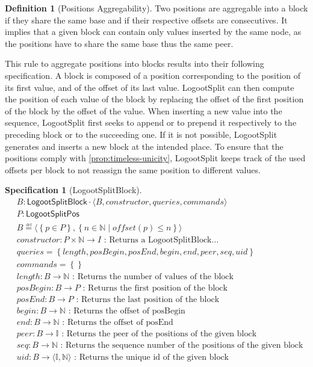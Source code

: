 \documentclass{article}
\newcommand{\commands}[1]{commands = \set{#1}}
\newcommand{\defeq}{\overset{\underset{\mathrm{def}}{}}{=}}
\newcommand{\fnspec}[3]{#1: #2 \text{ : #3}}
\newcommand{\inbb}[1]{\in \mathbb{#1}}
\newcommand{\queries}[1]{queries = \set{#1}}
\newcommand{\set}[1]{\left\{#1\right\}} %
\newcommand{\spectuple}[1]{\tuple{#1, constructor, queries, commands}}
\newcommand{\ssep}{\mid} %
\newcommand{\tuple}[1]{\langle #1 \rangle}
\newcounter{definition-counter}
\theoremstyle{definition}
\newtheorem{definition}[definition-counter]{Definition}
\newcounter{note-counter}
\theoremstyle{definition}
\theoremstyle{definition}
\newcounter{specificationcounter}
\theoremstyle{definition}
\newtheorem{specification}[specificationcounter]{Specification}
\begin{document}
\begin{definition}[Positions Aggregability]
    Two positions are aggregable into a block if they share the same base and if their respective offsets are consecutives.
    It implies that a given block can contain only values inserted by the same node, as the positions have to share the same base thus the same peer.
\end{definition}


This rule to aggregate positions into blocks results into their following specification.
A block is composed of a position corresponding to the position of its first value, and of the offset of its last value.
LogootSplit can then compute the position of each value of the block by replacing the offset of the first position of the block by the offset of the value.
When inserting a new value into the sequence, LogootSplit first seeks to append or to prepend it respectively to the preceding block or to the succeeding one.
If it is not possible, LogootSplit generates and inserts a new block at the intended place.
To ensure that the positions comply with \autoref{prop:timeless-unicity}, LogootSplit keeps track of the used offsets per block to not reassign the same position to different values.

\begin{specification}[LogootSplitBlock]
    \begin{align*}
    &B: \mathsf{LogootSplitBlock} \cdot \spectuple{B}\\
    &P: \mathsf{LogootSplitPos}\\
    &B \defeq \tuple{\set{p \in P}, \set{n \inbb{N} \ssep offset(p) \leq n}}\\
    &\fnspec{constructor}{P \times \mathbb{N} \to I}{Returns a LogootSplitBlock...}\\
    &\queries{length, posBegin, posEnd, begin, end, peer, seq, uid}\\
    &\commands{}\\
    &\fnspec{length}{B \to \mathbb{N}}{Returns the number of values of the block}\\
    &\fnspec{posBegin}{B \to P}{Returns the first position of the block}\\
    &\fnspec{posEnd}{B \to P}{Returns the last position of the block}\\
    &\fnspec{begin}{B \to \mathbb{N}}{Returns the offset of posBegin}\\
    &\fnspec{end}{B \to \mathbb{N}}{Returns the offset of posEnd}\\
    &\fnspec{peer}{B \to \mathbb{I}}{Returns the peer of the positions of the given block}\\
    &\fnspec{seq}{B \to \mathbb{N}}{Returns the sequence number of the positions of the given block}\\
    &\fnspec{uid}{B \to \tuple{\mathbb{I}, \mathbb{N}}}{Returns the unique id of the given block}
    \end{align*}
    \label{spec:logootsplit-block}
\end{specification}
\end{document}
